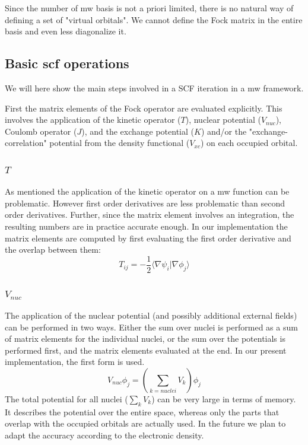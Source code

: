 \documentclass{article}
\begin{document}
Since the number of mw basis is not a priori limited, there is no natural way of defining a set of "virtual orbitals". We cannot define the Fock matrix in the entire basis and even less diagonalize it.


\subsection{Basic scf operations} %

We will here show the main steps involved in a SCF iteration in a mw framework.

First the matrix elements of the Fock operator are evaluated explicitly. This involves the application of the kinetic operator ($T$), nuclear  potential ($V_{nuc}$), Coulomb operator ($J$), and  the exchange potential ($K$) and/or the "exchange-correlation" potential from the density functional ($V_{xc}$) on each occupied orbital.

\subsubsection{$T$}
As mentioned the application of the kinetic operator on a mw function can be problematic. However first order derivatives are less problematic than second order derivatives. Further, since the matrix element involves an integration, the resulting numbers are in practice accurate enough. 
In our implementation the matrix elements are computed by first evaluating the first order derivative and the overlap between them:
\begin{equation}
  T_{ij} = -\frac{1}{2} \langle \nabla \psi_i |\nabla {\phi_j}\rangle
\end{equation}


\subsubsection{$V_{nuc}$}

The application of the nuclear potential (and possibly additional external fields) can be performed in two ways. Either the sum over nuclei is performed as a sum of matrix elements for the individual nuclei, or the sum over the potentials is performed first, and the matrix elements evaluated at the end. In our present implementation, the first form is used.
\begin{equation}
  V_{nuc} \phi_j = (\sum_{k = nuclei} V_k) \phi_j
\end{equation}
The total potential for all nuclei ($\sum_{k} V_k$) can be very large in terms of memory. It describes the potential over the entire space, whereas only the parts that overlap with the occupied orbitals are actually used. In the future we plan to adapt the accuracy according to the electronic density.
\end{document}
